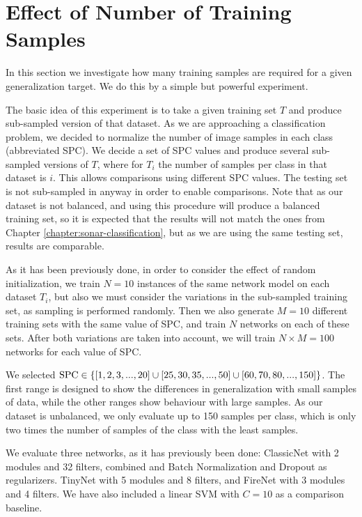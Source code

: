 \FloatBarrier
\section{Effect of Number of Training Samples}
\label{lim:secNumTrainingSamples}

In this section we investigate how many training samples are required for a given generalization target. We do this by a simple but powerful experiment.

The basic idea of this experiment is to take a given training set $T$ and produce sub-sampled version of that dataset. As we are approaching a classification problem, we decided to normalize the number of image samples in each class (abbreviated SPC). We decide a set of SPC values and produce several sub-sampled versions of $T$, where for $T_{i}$ the number of samples per class in that dataset is $i$. This allows comparisons using different SPC values. The testing set is not sub-sampled in anyway in order to enable comparisons. Note that as our dataset is not balanced, and using this procedure will produce a balanced training set, so it is expected that the results will not match the ones from Chapter \ref{chapter:sonar-classification}, but as we are using the same testing set, results are comparable.

As it has been previously done, in order to consider the effect of random initialization, we train $N = 10$ instances of the same network model on each dataset $T_{i}$, but also we must consider the variations in the sub-sampled training set, as sampling is performed randomly. Then we also generate $M = 10$ different training sets with the same value of SPC, and train $N$ networks on each of these sets. After both variations are taken into account, we will train $N \times M = 100$ networks for each value of SPC.

We selected $\text{SPC} \in \{ [1, 2, 3, ..., 20] \cup [25, 30, 35, ..., 50] \cup [60, 70, 80, \\ ..., 150] \}$. The first range is designed to show the differences in generalization with small samples of data, while the other ranges show behaviour with large samples. As our dataset is unbalanced, we only evaluate up to 150 samples per class, which is only two times the number of samples of the class with the least samples.

We evaluate three networks, as it has previously been done: ClassicNet with 2 modules and 32 filters, combined and Batch Normalization and Dropout as regularizers. TinyNet with 5 modules and 8 filters, and FireNet with 3 modules and 4 filters. We have also included a linear SVM with $C = 10$ as a comparison baseline.

